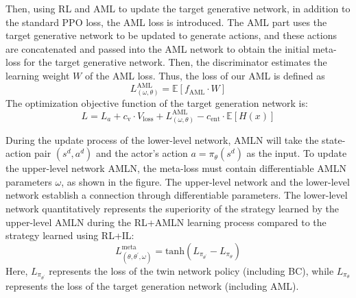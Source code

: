 \documentclass[lettersize,journal]{IEEEtran}
\begin{document}
Then, using RL and AML to update the target generative network, in addition to the standard PPO loss, the AML loss is introduced. The AML part uses the target generative network to be updated to generate actions, and these actions are concatenated and passed into the AML network to obtain the initial meta-loss for the target generative network. Then, the discriminator estimates the learning weight $W$ of the AML loss. Thus, the loss of our AML is defined as
\begin{equation}
  L^{\text{AML}}_{(\omega,\theta)}=\mathbb{E}[f_{\text{AML}}\cdot W]
\end{equation}
The optimization objective function of the target generation network is:
\begin{equation}
\label{actor_loss}
  L = L_{a} + c_{\text{v}} \cdot V_{\text{loss}} + L^{\text{AML}}_{(\omega,\theta)} - c_{\text{ent}} \cdot \mathbb{E}[H(x)]
\end{equation}

During the update process of the lower-level network, AMLN will take the state-action pair $(s^d, a^d)$ and the actor's action $a = \pi_\theta(s^d)$ as the input. To update the upper-level network AMLN, the meta-loss must contain differentiable AMLN parameters $\omega$, as shown in the figure. The upper-level network and the lower-level network establish a connection through differentiable parameters. The lower-level network quantitatively represents the superiority of the strategy learned by the upper-level AMLN during the RL+AMLN learning process compared to the strategy learned using RL+IL:
\begin{equation}
\label{AMLN_loss}
L^{\text{meta}}_{(\theta,\theta^{\prime},\omega)}= \text{tanh}(L_{\pi_{\theta^{\prime}}}-L_{\pi_{\theta}})
\end{equation}
Here, $L_{\pi_{\theta^{\prime}}}$ represents the loss of the twin network policy (including BC), while $L_{\pi_{\theta}}$ represents the loss of the target generation network (including AML).
\end{document}
